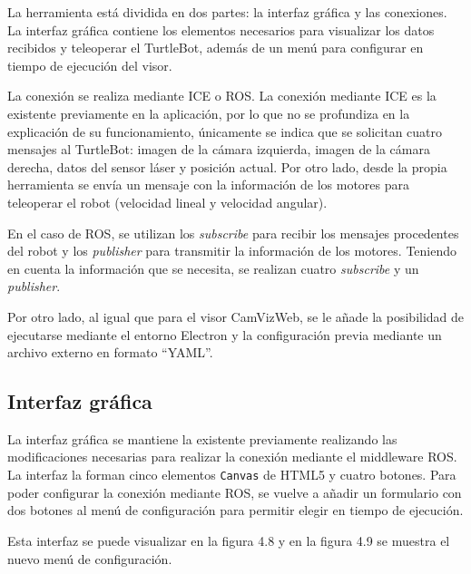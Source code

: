 La herramienta está dividida en dos partes: la interfaz gráfica y las conexiones. La interfaz gráfica contiene los elementos necesarios para visualizar los datos recibidos y teleoperar el TurtleBot, además de un menú para configurar en tiempo de ejecución del visor.

La conexión se realiza mediante ICE o ROS. La conexión mediante ICE es la existente previamente en la aplicación, por lo que no se profundiza en la explicación de su funcionamiento, únicamente se indica que se solicitan cuatro mensajes al TurtleBot: imagen de la cámara izquierda, imagen de la cámara derecha, datos del sensor láser y posición actual. Por otro lado, desde la propia herramienta se envía un mensaje con la información de los motores para teleoperar el robot (velocidad lineal y velocidad angular).

En el caso de ROS, se utilizan los \textit{subscribe} para recibir los mensajes procedentes del robot y los \textit{publisher} para transmitir la información de los motores. Teniendo en cuenta la información que se necesita, se realizan cuatro \textit{subscribe} y un \textit{publisher}.

Por otro lado, al igual que para el visor CamVizWeb, se le añade la posibilidad de ejecutarse mediante el entorno Electron y la configuración previa mediante un archivo externo en formato ``YAML''.

\subsection{Interfaz gráfica}
La interfaz gráfica se mantiene la existente previamente realizando las modificaciones necesarias para realizar la conexión mediante el middleware ROS. La interfaz la forman cinco elementos \texttt{Canvas} de HTML5 y cuatro botones. Para poder configurar la conexión mediante ROS, se vuelve a añadir un formulario con dos botones al menú de configuración para permitir elegir en tiempo de ejecución.

Esta interfaz se puede visualizar en la figura 4.8 y en la figura 4.9 se muestra el nuevo menú de configuración.

